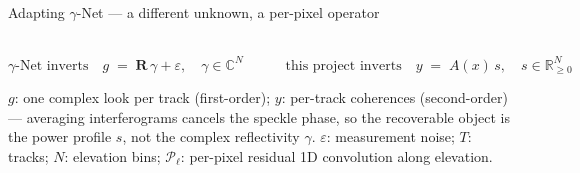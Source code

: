 \begin{frame}{Adapting $\gamma$-Net --- a different unknown, a per-pixel operator}
\begin{tikzpicture}
  \end{tikzpicture}
  \\[2pt]
  \vspace{-2pt}
  \[
    \text{$\gamma$-Net inverts}\quad g \;=\; \mathbf{R}\,\gamma + \varepsilon,\quad \gamma \in \mathbb{C}^{N}
    \qquad\quad
    \text{this project inverts}\quad y \;=\; A(x)\,s,\quad s \in \mathbb{R}_{\ge 0}^{N}
  \]
  {\scriptsize $g$: one complex look per track (first-order); $y$: per-track coherences
   (second-order) --- averaging interferograms cancels the speckle phase, so the
   recoverable object is the power profile $s$, not the complex reflectivity $\gamma$.
   $\varepsilon$: measurement noise; $T$: tracks; $N$: elevation bins;
   $\mathcal{P}_\ell$: per-pixel residual 1D convolution along elevation.\par}
\end{frame}

